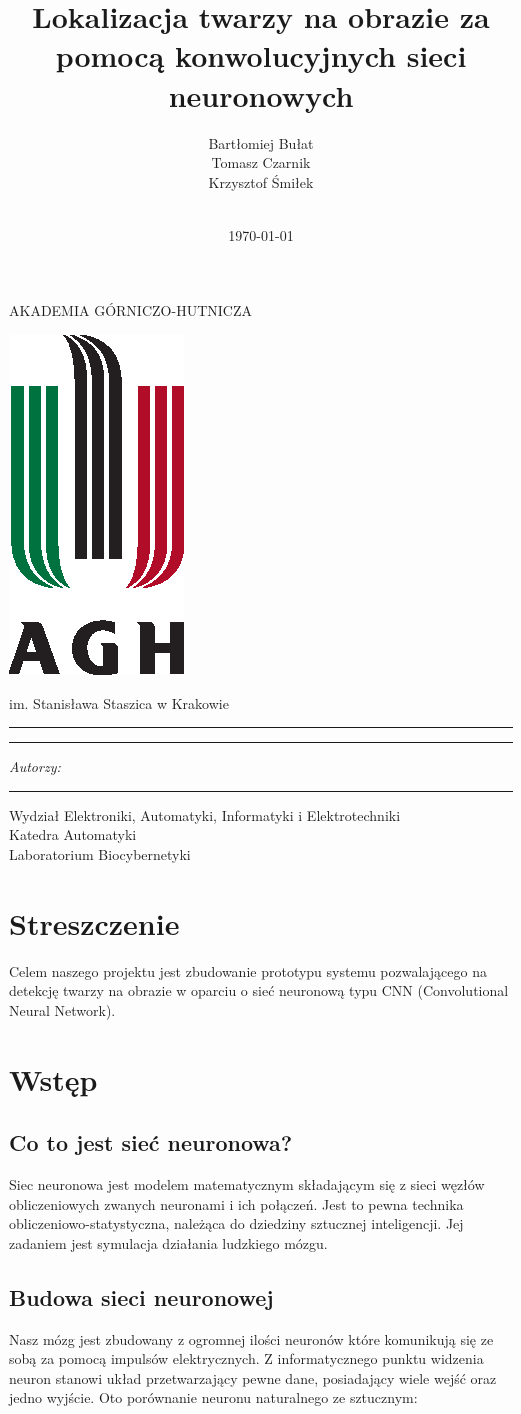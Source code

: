 \documentclass[11pt,a4paper]{article}
\title{Lokalizacja twarzy na obrazie za pomocą konwolucyjnych sieci neuronowych}
\author{Bartłomiej Bułat\\
    Tomasz Czarnik\\
    Krzysztof Śmiłek\\\\}
\date{\today}
\makeatletter
\renewcommand{\maketitle}{
\begin{titlepage}
\begin{center}

\LARGE{AKADEMIA GÓRNICZO-HUTNICZA}

\vspace*{1cm}
\includegraphics[scale=1.8]{agh.eps}
\vspace*{1cm}

\LARGE{im. Stanisława Staszica w Krakowie}

\rule{\textwidth}{0.4mm}
\LARGE \textsc{\@title}
\rule{\textwidth}{0.4mm}

\vspace*{5mm}
\begin{flushright}

    \begin{minipage}{5cm}

    \textit{\small Autorzy:}\\
    \normalsize \textsc{\@author} \par

    \end{minipage}

\end{flushright}
\vspace*{\stretch{8}}
\rule{\textwidth}{0.4mm}

\large{Wydział Elektroniki, Automatyki, Informatyki i Elektrotechniki}\\
\large{Katedra Automatyki}\\
\large{Laboratorium Biocybernetyki}\\
\vspace*{\stretch{7}}
\@date

\end{center}

\end{titlepage}
}
\makeatother
\begin{document}
\maketitle
\printindex


\section{Streszczenie}

Celem naszego projektu jest zbudowanie prototypu systemu pozwalającego na detekcję twarzy na obrazie 
w oparciu o sieć neuronową typu CNN (Convolutional Neural Network).
\section{Wstęp}

\subsection{Co to jest sieć neuronowa?}
Siec neuronowa jest modelem matematycznym składającym się z sieci węzłów obliczeniowych zwanych neuronami
 i ich połączeń. Jest to pewna technika obliczeniowo-statystyczna, należąca do dziedziny sztucznej inteligencji. 
Jej zadaniem jest symulacja działania ludzkiego mózgu. 

\subsection{Budowa sieci neuronowej }
Nasz mózg jest zbudowany z ogromnej ilości neuronów które komunikują się ze sobą za pomocą impulsów elektrycznych.
 Z informatycznego punktu widzenia neuron stanowi układ przetwarzający pewne dane, posiadający wiele wejść
 oraz jedno wyjście. Oto porównanie neuronu naturalnego ze sztucznym:
\end{document}
